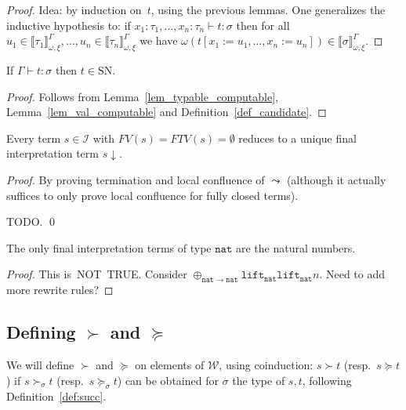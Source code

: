 \documentclass[runningheads,a4paper]{llncs}
\newcommand{\Iterms}{\mathcal{I}}
\newcommand{\World}{\mathcal{W}}
\newcommand{\subst}[2]{#1:=#2}
\newcommand{\FTV}{\mathit{FTV}}
\newcommand{\FV}{\mathit{FV}}
\newcommand{\nat}{\mathtt{nat}}
\newcommand{\lift}{\mathtt{lift}}
\newcommand{\SN}{\mathrm{SN}}
\newcommand{\val}[3]{\ensuremath{\llbracket#1\rrbracket_{#2}^{#3}}}
\newcommand{\proves}{\vdash}
\begin{document}
\begin{proof}
  Idea: by induction on~$t$, using the previous lemmas. One
  generalizes the inductive hypothesis to: if
  $x_1 : \tau_1,\ldots,x_n:\tau_n \proves t : \sigma$ then for all
  $u_1\in\val{\tau_1}{\omega,\xi}{\Gamma},\ldots,u_n\in\val{\tau_n}{\omega,\xi}{\Gamma}$
  we have
  $\omega(t[\subst{x_1}{u_1},\ldots,\subst{x_n}{u_n}]) \in
  \val{\sigma}{\omega,\xi}{\Gamma}$.
\end{proof}

\begin{corollary}
  If $\Gamma \proves t : \sigma$ then $t \in \SN$.
\end{corollary}

\begin{proof}
  Follows from Lemma~\ref{lem_typable_computable},
  Lemma~\ref{lem_val_computable} and Definition~\ref{def_candidate}.
\end{proof}

\begin{lemma}
Every term $s \in \Iterms$ with $\FV(s) = \FTV(s) = \emptyset$ reduces
to a unique final interpretation term $s\downarrow$.
\end{lemma}

\begin{proof}
By proving termination and local confluence of $\leadsto$ (although it
actually suffices to only prove local confluence for fully closed terms).

TODO.
\qed
\end{proof}

\begin{lemma}
The only final interpretation terms of type $\nat$ are the natural
numbers.
\end{lemma}

\begin{proof}
  This is~NOT~TRUE. Consider
  $\oplus_{\nat\to\nat} \lift_\nat \lift_\nat n$. Need to add more
  rewrite rules?
\end{proof}

\subsection{Defining $\succ$ and $\succeq$}

We will define $\succ$ and $\succeq$ on elements of $\World$, using
coinduction: $s \succ t$ (resp.\ $s \succeq t$) if $s \succ_\sigma t$
(resp.\ $s \succeq_\sigma t$) can be obtained for $\sigma$ the type of
$s,t$, following Definition~\ref{def:succ}.
\end{document}
